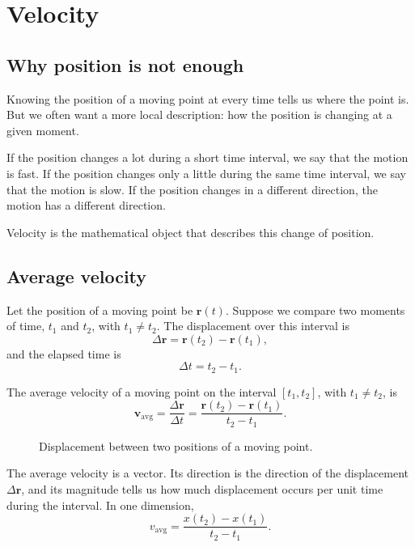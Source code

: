 \section{Velocity}

\subsection{Why position is not enough}

Knowing the position of a moving point at every time tells us where the point is. But we often want a more local description: how the position is changing at a given moment.

If the position changes a lot during a short time interval, we say that the motion is fast. If the position changes only a little during the same time interval, we say that the motion is slow. If the position changes in a different direction, the motion has a different direction.

Velocity is the mathematical object that describes this change of position.

\subsection{Average velocity}

Let the position of a moving point be \(\mathbf{r}(t)\). Suppose we compare two moments of time, \(t_1\) and \(t_2\), with \(t_1\neq t_2\). The displacement over this interval is
\[
\Delta \mathbf{r}=\mathbf{r}(t_2)-\mathbf{r}(t_1),
\]
and the elapsed time is
\[
\Delta t=t_2-t_1.
\]

\begin{definitionbox}
The average velocity of a moving point on the interval \([t_1,t_2]\), with \(t_1\neq t_2\), is
\[
\mathbf{v}_{\mathrm{avg}}
=
\frac{\Delta \mathbf{r}}{\Delta t}
=
\frac{\mathbf{r}(t_2)-\mathbf{r}(t_1)}{t_2-t_1}.
\]
\end{definitionbox}

\begin{figure}[htbp]
\centering

\caption{Displacement between two positions of a moving point.}
\label{fig:kinematics-displacement-between-positions}
\end{figure}

The average velocity is a vector. Its direction is the direction of the displacement \(\Delta\mathbf{r}\), and its magnitude tells us how much displacement occurs per unit time during the interval. In one dimension,
\[
v_{\mathrm{avg}}=
\frac{x(t_2)-x(t_1)}{t_2-t_1}.
\]

